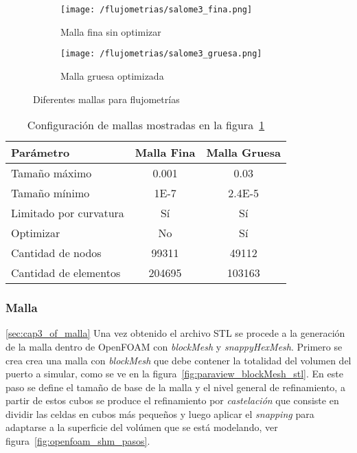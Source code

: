 \begin{figure}[t!]
    \centering
    \begin{subfigure}[t]{0.5\textwidth}
        \centering
        \texttt{[image: /flujometrias/salome3\_fina.png]}
        \caption{Malla fina sin optimizar}
    \end{subfigure}%
    \begin{subfigure}[t]{0.5\textwidth}
        \centering
        \texttt{[image: /flujometrias/salome3\_gruesa.png]}
        \caption{Malla gruesa optimizada}
    \end{subfigure}
    \caption{Diferentes mallas para flujometrías}\label{fig:salome_fina_gruesa}
\end{figure}

\begin{table}
    \centering
    \begin{tabular}{lcc} \toprule
        Parámetro                & Malla Fina    & Malla Gruesa \\ \midrule
        Tamaño máximo            & 0.001         & 0.03 \\
        Tamaño mínimo            & 1E-7          & 2.4E-5 \\
        Limitado por curvatura   & Sí            & Sí \\
        Optimizar                & No            & Sí \\
        Cantidad de nodos        & 99311         & 49112 \\
        Cantidad de elementos    & 204695        & 103163 \\ \bottomrule
    \end{tabular}
    \caption{Configuración de mallas mostradas en la figura~\ref{fig:salome_fina_gruesa}}
    \label{tab:salome_fina_gruesa}
\end{table}

\subsubsection{Malla}\ref{sec:cap3_of_malla}
%
Una vez obtenido el archivo STL se procede a la generación de la malla dentro de
OpenFOAM con \emph{blockMesh} y \emph{snappyHexMesh}.
%
Primero se crea crea una malla con \emph{blockMesh} que  debe contener la
totalidad del volumen del puerto a simular, como se ve en la
figura~\ref{fig:paraview_blockMesh_stl}.
%
En este paso se define el tamaño de base de la malla y el nivel general de
refinamiento, a partir de estos cubos se produce el refinamiento por
\emph{castelación} que consiste en dividir las celdas en cubos más pequeños y luego
aplicar el \emph{snapping} para adaptarse a la superficie del volúmen que se está
modelando, ver figura~\ref{fig:openfoam_shm_pasos}.
%

